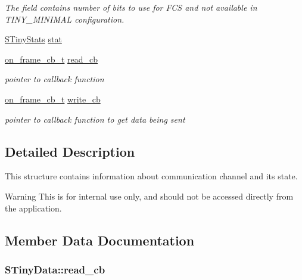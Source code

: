 \begin{DoxyCompactItemize}
\begin{DoxyCompactList}\small\item\em The field contains number of bits to use for F\+C\+S and not available in T\+I\+N\+Y\+\_\+\+M\+I\+N\+I\+M\+A\+L configuration. \end{DoxyCompactList}\item 
\hyperlink{structSTinyStats}{S\+Tiny\+Stats} \hyperlink{structSTinyData_a16ba8c9e60d6aee3fcd4909f85561f3d}{stat}
\item 
\hyperlink{tiny__layer2_8h_acf94db3677aab46f4a42978d53cc23e3}{on\+\_\+frame\+\_\+cb\+\_\+t} \hyperlink{structSTinyData_a31ba50154472c11e0d063b0aeef95f4d}{read\+\_\+cb}
\begin{DoxyCompactList}\small\item\em pointer to callback function \end{DoxyCompactList}\item 
\hyperlink{tiny__layer2_8h_acf94db3677aab46f4a42978d53cc23e3}{on\+\_\+frame\+\_\+cb\+\_\+t} \hyperlink{structSTinyData_ada334c88e86bfd2c10191f65818c3fb3}{write\+\_\+cb}
\begin{DoxyCompactList}\small\item\em pointer to callback function to get data being sent \end{DoxyCompactList}\end{DoxyCompactItemize}


\subsection{Detailed Description}
This structure contains information about communication channel and its state. \begin{DoxyWarning}{Warning}
This is for internal use only, and should not be accessed directly from the application. 
\end{DoxyWarning}


\subsection{Member Data Documentation}
\hypertarget{structSTinyData_a31ba50154472c11e0d063b0aeef95f4d}{}
\subsubsection[{read\+\_\+cb}]{ S\+Tiny\+Data\+::read\+\_\+cb}\label{structSTinyData_a31ba50154472c11e0d063b0aeef95f4d}



